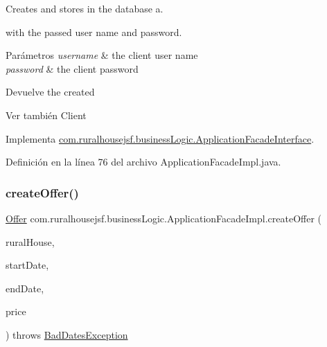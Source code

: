 Creates and stores in the database a. 


\begin{DoxyCode}{0}
\end{DoxyCode}
 with the passed user name and password.


\begin{DoxyParams}{Parámetros}
{\em username} & the client user name \\
\hline
{\em password} & the client password\\
\hline
\end{DoxyParams}
\begin{DoxyReturn}{Devuelve}
the created
\begin{DoxyCode}{0}
\end{DoxyCode}

\end{DoxyReturn}
\begin{DoxySeeAlso}{Ver también}
Client 
\end{DoxySeeAlso}


Implementa \mbox{\hyperlink{a00136_acb939a4c57b1136e2e8d1c7b661c10af}{com.\+ruralhousejsf.\+business\+Logic.\+Application\+Facade\+Interface}}.



Definición en la línea 76 del archivo Application\+Facade\+Impl.\+java.

\mbox{\label{a00132_acbf81cc6dc4bf9adf9ea7a85751edfc0}} 
\subsubsection{\texorpdfstring{createOffer()}{createOffer()}\hspace{0.1cm}{\footnotesize\ttfamily [1/2]}}
{\footnotesize\ttfamily \mbox{\hyperlink{a00184}{Offer}} com.\+ruralhousejsf.\+business\+Logic.\+Application\+Facade\+Impl.\+create\+Offer (\begin{DoxyParamCaption}\item[{\mbox{\hyperlink{a00188}{Rural\+House}}}]{rural\+House,  }\item[{Local\+Date}]{start\+Date,  }\item[{Local\+Date}]{end\+Date,  }\item[{double}]{price }\end{DoxyParamCaption}) throws \mbox{\hyperlink{a00208}{Bad\+Dates\+Exception}}}



